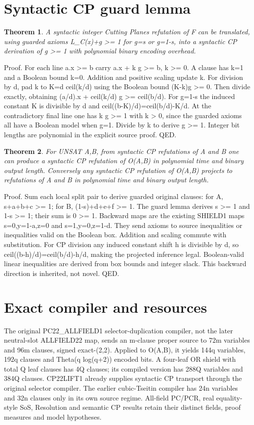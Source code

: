 \documentclass{article}
\newtheorem{theorem}{Theorem}
\begin{document}
\section{Syntactic CP guard lemma}
\begin{theorem}
A syntactic integer Cutting Planes refutation of F can be translated, using guarded axioms L_C(x)+g >= 1 for g=s or g=1-s, into a syntactic CP derivation of g >= 1 with polynomial binary encoding overhead.
\end{theorem}
\noindent Proof. For each line a.x >= b carry a.x + k g >= b, k >= 0. A clause has k=1 and a Boolean bound k=0. Addition and positive scaling update k. For division by d, pad k to K=d ceil(k/d) using the Boolean bound (K-k)g >= 0. Then divide exactly, obtaining (a/d).x + ceil(k/d) g >= ceil(b/d). For g=1-s the induced constant K is divisible by d and ceil((b-K)/d)=ceil(b/d)-K/d. At the contradictory final line one has k g >= 1 with k > 0, since the guarded axioms all have a Boolean model when g=1. Divide by k to derive g >= 1. Integer bit lengths are polynomial in the explicit source proof. QED.
\begin{theorem}
For UNSAT A,B, from syntactic CP refutations of A and B one can produce a syntactic CP refutation of O(A,B) in polynomial time and binary output length. Conversely any syntactic CP refutation of O(A,B) projects to refutations of A and B in polynomial time and binary output length.
\end{theorem}
\noindent Proof. Sum each local split pair to derive guarded original clauses: for A, s+a+b+c >= 1; for B, (1-s)+d+e+f >= 1. The guard lemma derives s >= 1 and 1-s >= 1; their sum is 0 >= 1. Backward maps are the existing SHIELD1 maps s=0,y=1-a,z=0 and s=1,y=0,z=1-d. They send axioms to source inequalities or inequalities valid on the Boolean box. Addition and scaling commute with substitution. For CP division any induced constant shift h is divisible by d, so ceil((b-h)/d)=ceil(b/d)-h/d, making the projected inference legal. Boolean-valid linear inequalities are derived from box bounds and integer slack. This backward direction is inherited, not novel. QED.
\section{Exact compiler and resources}
The original PC22_ALLFIELD1 selector-duplication compiler, not the later neutral-slot ALLFIELD22 map, sends an m-clause proper source to 72m variables and 96m clauses, signed exact-(2,2). Applied to O(A,B), it yields 144q variables, 192q clauses and Theta(q log(q+2)) encoded bits. A four-leaf OR shield with total Q leaf clauses has 4Q clauses; its compiled version has 288Q variables and 384Q clauses. CP22LIFT1 already supplies syntactic CP transport through the original selector compiler. The earlier cubic-Tseitin compiler has 24n variables and 32n clauses only in its own source regime. All-field PC/PCR, real equality-style SoS, Resolution and semantic CP results retain their distinct fields, proof measures and model hypotheses.
\end{document}
